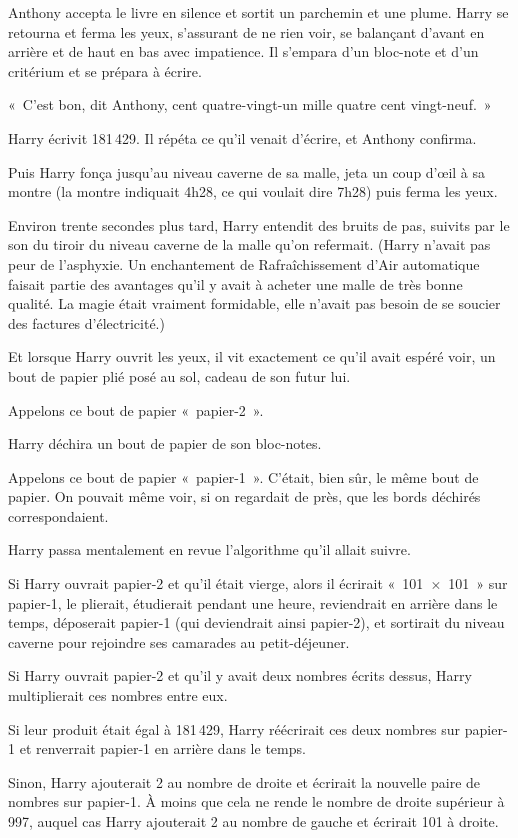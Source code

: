 Anthony accepta le livre en silence et sortit un parchemin et une plume.
Harry se retourna et ferma les yeux, s'assurant de ne rien voir, se balançant d'avant en arrière et de haut en bas avec impatience.
Il s'empara d'un bloc-note et d'un critérium et se prépara à écrire.

«~C'est bon, dit Anthony, cent quatre-vingt-un mille quatre cent vingt-neuf.~»

Harry écrivit 181\,429. Il répéta ce qu'il venait d'écrire, et Anthony confirma.

Puis Harry fonça jusqu'au niveau caverne de sa malle, jeta un coup d'œil à sa montre (la montre indiquait 4h28, ce qui voulait dire 7h28) puis ferma les yeux.

Environ trente secondes plus tard, Harry entendit des bruits de pas, suivits par le son du tiroir du niveau caverne de la malle qu'on refermait.
(Harry n'avait pas peur de l'asphyxie.
Un enchantement de Rafraîchissement d'Air automatique faisait partie des avantages qu'il y avait à acheter une malle de très bonne qualité.
La magie était vraiment formidable, elle n'avait pas besoin de se soucier des factures d'électricité.)

Et lorsque Harry ouvrit les yeux, il vit exactement ce qu'il avait espéré voir, un bout de papier plié posé au sol, cadeau de son futur lui.

Appelons ce bout de papier «~papier-2~».

Harry déchira un bout de papier de son bloc-notes.

Appelons ce bout de papier «~papier-1~».
C'était, bien sûr, le même bout de papier.
On pouvait même voir, si on regardait de près, que les bords déchirés correspondaient.

Harry passa mentalement en revue l'algorithme qu'il allait suivre.

Si Harry ouvrait papier-2 et qu'il était vierge, alors il écrirait «~101~$\times$~101~» sur papier-1, le plierait, étudierait pendant une heure, reviendrait en arrière dans le temps, déposerait papier-1 (qui deviendrait ainsi papier-2), et sortirait du niveau caverne pour rejoindre ses camarades au petit-déjeuner.

Si Harry ouvrait papier-2 et qu'il y avait deux nombres écrits dessus, Harry multiplierait ces nombres entre eux.

Si leur produit était égal à 181\,429, Harry réécrirait ces deux nombres sur papier-1 et renverrait papier-1 en arrière dans le temps.

Sinon, Harry ajouterait 2 au nombre de droite et écrirait la nouvelle paire de nombres sur papier-1.
À moins que cela ne rende le nombre de droite supérieur à 997, auquel cas Harry ajouterait 2 au nombre de gauche et écrirait 101 à droite.


